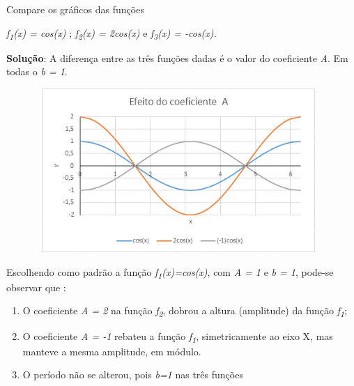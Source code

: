 \begin{texemplo}
Compare os gráficos das funções

\textit{f\textsubscript{1}(x) = cos(x)} ; \tab  \textit{f\textsubscript{2}(x) = 2cos(x)} \tab e \tab \textit{f\textsubscript{3}(x) = -cos(x).}

\textbf{Solução}: A diferença entre as três funções dadas é o valor do coeficiente \textit{A}. Em todas o \textit{b = 1}.

\begin{figure}[H]
    \begin{Center}
        \includegraphics[width=4.31in,height=2.45in]{capitulos/trigonometria_e_funcoes_trigonometricas/media/image32.png}
    \end{Center}
\end{figure}

Escolhendo como padrão a função \textit{f\textsubscript{1}(x)=cos(x)}, com \textit{A = 1}  e \textit{b = 1}, pode-se observar que :

\begin{enumerate}
    \item O coeficiente \textit{A = 2} na função \textit{f\textsubscript{2}}, dobrou a altura (amplitude) da função \textit{f\textsubscript{1}};

    \item O coeficiente \textit{A = -1} rebateu a função \textit{f\textsubscript{1}}, simetricamente ao eixo X, mas manteve a mesma amplitude, em módulo.

    \item O período não se alterou, pois  \textit{b=1 } nas três funções \qedsymbol
\end{enumerate}
\end{texemplo}

